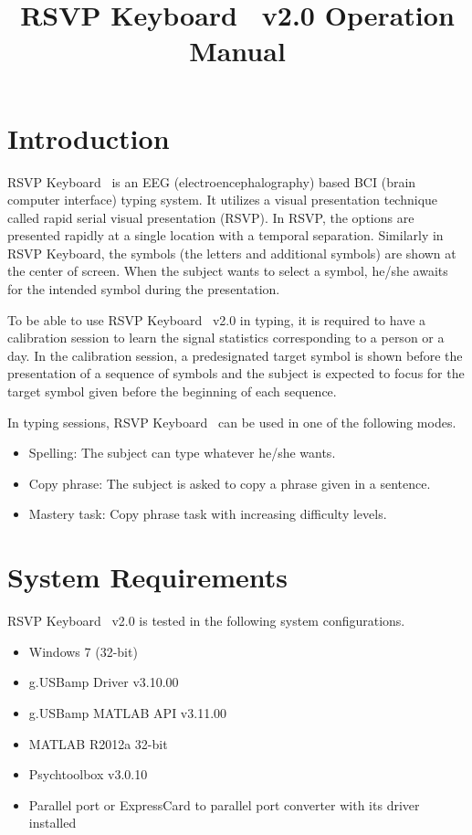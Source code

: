 \documentclass[12pt,letterpaper]{report}
\title{RSVP Keyboard\texttrademark~ v2.0 Operation Manual}
\begin{document}
\maketitle
\tableofcontents
\chapter{Introduction}
RSVP Keyboard\texttrademark~ is an EEG (electroencephalography) based BCI (brain computer interface) typing system. It utilizes a visual presentation technique called rapid serial visual presentation (RSVP). In RSVP, the options are presented rapidly at a single location with a temporal separation. Similarly in RSVP Keyboard\texttrademark , the symbols (the letters and additional symbols) are shown at the center of screen. When the subject wants to select a symbol, he/she awaits for the intended symbol during the presentation. 

To be able to use RSVP Keyboard\texttrademark~ v2.0 in typing, it is required to have a calibration session to learn the signal statistics corresponding to a person or a day. In the calibration session, a predesignated target symbol is shown before the presentation of a sequence of symbols and the subject is expected to focus for the target symbol given before the beginning of each sequence.

In typing sessions, RSVP Keyboard\texttrademark~ can be used in one of the following modes.
\begin{itemize}
\item{Spelling:} The subject can type whatever he/she wants.
\item{Copy phrase:} The subject is asked to copy a phrase given in a sentence.
\item{Mastery task:} Copy phrase task with increasing difficulty levels.
\end{itemize}
\chapter{System Requirements}
RSVP Keyboard\texttrademark~ v2.0 is tested in the following system configurations.
\begin{itemize}
	\item{Windows 7 (32-bit)}
	\item{g.USBamp Driver v3.10.00}
	\item{g.USBamp MATLAB API v3.11.00}
	\item{MATLAB R2012a 32-bit}
	\item{Psychtoolbox v3.0.10}
	\item{Parallel port or ExpressCard to parallel port converter with its driver installed}
\end{itemize}
\end{document}
